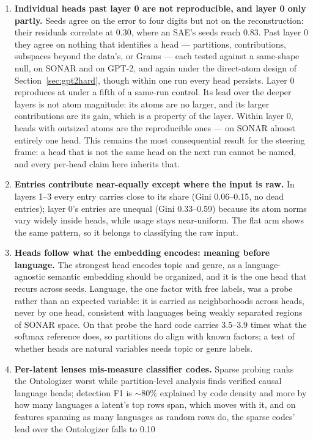 \begin{enumerate}
\item \textbf{Individual heads past layer 0 are not reproducible, and
layer 0 only partly.} Seeds agree on the error to four digits but not
on the reconstruction: their residuals correlate at 0.30, where an SAE's
seeds reach 0.83. Past layer 0 they agree on nothing that identifies a
head --- partitions, contributions, subspaces beyond the data's, or
Grams --- each tested against a same-shape null, on SONAR and on GPT-2,
and again under the direct-atom design of Section~\ref{sec:gpt2hard},
though within one run every head persists. Layer 0 reproduces at
under a fifth of a same-run control. Its lead over the deeper layers is
not atom magnitude: its atoms are no larger, and its larger contributions
are its gain, which is a property of the layer. Within layer 0, heads
with outsized atoms are the reproducible ones --- on SONAR almost
entirely one head. This remains the most consequential result for the
steering frame: a head that is not the same head on the next run cannot
be named, and every per-head claim here inherits that.
\item \textbf{Entries contribute near-equally except where the input is
raw.} In layers 1--3 every entry carries close to its share (Gini
0.06--0.15, no dead entries); layer 0's entries are unequal (Gini
0.33--0.59) because its atom norms vary widely inside heads, while
usage stays near-uniform. The flat arm shows the same pattern, so it
belongs to classifying the raw input.
\item \textbf{Heads follow what the embedding encodes: meaning before
language.} The strongest head encodes topic and genre, as a
language-agnostic semantic embedding should be organized, and it is the
one head that recurs across seeds. Language, the
one factor with free labels, was a probe rather than an expected
variable: it is carried as neighborhoods across heads, never by one
head, consistent with languages being weakly separated regions of SONAR
space. On that probe the hard code carries 3.5--3.9 times what the softmax
reference does, so partitions do align with known factors; a test of
whether heads are natural variables needs topic or genre labels.
\item \textbf{Per-latent lenses mis-measure classifier codes.} Sparse
probing ranks the Ontologizer worst while partition-level analysis finds
verified causal language heads; detection F1 is $\sim$80\% explained by
code density and more by how many languages a latent's top rows span,
which moves with it, and on features spanning as many languages as
random rows do, the sparse codes' lead over the Ontologizer falls to 0.10

\end{enumerate}
